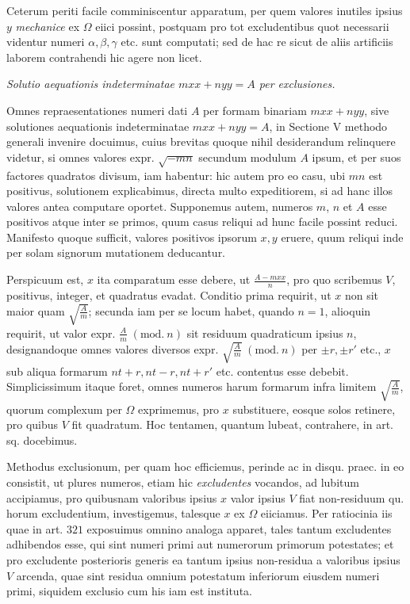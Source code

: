 Ceterum periti facile comminiscentur apparatum, per quem valores inutiles ipsius \(y\) \textit{mechanice} ex \(\Omega\) eiici possint, postquam pro tot excludentibus quot necessarii videntur numeri \(\alpha,\allowbreak \beta,\allowbreak \gamma\) etc. sunt computati; sed de hac re sicut de aliis artificiis laborem contrahendi hic agere non licet.

\begin{center}\textit{Solutio aequationis indeterminatae \(mxx+nyy=A\) per exclusiones.}\end{center}


Omnes repraesentationes numeri dati \(A\) per formam binariam \(mxx+nyy\),
sive solutiones aequationis indeterminatae \(mxx+nyy=A\), in Sectione V methodo generali invenire docuimus, cuius brevitas quoque nihil desiderandum relinquere videtur, si omnes valores expr. \(\surd{-mn}\) secundum modulum \(A\) ipsum, et per suos factores quadratos divisum, iam habentur: hic autem pro eo casu, ubi \(mn\) est positivus, solutionem explicabimus, directa multo expeditiorem, si ad hanc illos valores antea computare oportet. Supponemus autem, numeros \(m\), \(n\) et \(A\) esse positivos atque inter se primos, quum casus reliqui ad hunc facile possint reduci. Manifesto quoque sufficit, valores positivos ipsorum \(x,\allowbreak y\) eruere, quum reliqui inde per solam signorum mutationem deducantur.

Perspicuum est, \(x\) ita comparatum esse debere, ut \(\frac{A-mxx}{n}\), pro quo scribemus \(V\), positivus, integer, et quadratus evadat. Conditio prima requirit, ut \(x\) non sit maior quam \(\surd{\frac Am}\); secunda iam per se locum habet, quando \(n=1\), alioquin requirit, ut valor expr. \(\frac Am\; (\mathrm{mod}.\ n)\) sit residuum quadraticum ipsius \(n\), designandoque omnes valores diversos expr. \(\surd{\frac Am}\; (\mathrm{mod}.\ n)\) per \(\pm r,\allowbreak \pm r'\) etc., \(x\) sub aliqua formarum \(nt+r,\allowbreak nt-r,\allowbreak nt+r'\) etc. contentus esse debebit. Simplicissimum itaque foret, omnes numeros harum formarum infra limitem \(\surd{\frac Am}\), quorum complexum per \(\Omega\) exprimemus, pro \(x\) substituere, eosque solos retinere, pro quibus \(V\) fit quadratum. Hoc tentamen, quantum lubeat, contrahere, in art. sq. docebimus.

Methodus exclusionum, per quam hoc efficiemus, perinde ac in disqu. praec. in eo consistit, ut plures numeros, etiam hic \textit{excludentes} vocandos, ad lubitum accipiamus, pro quibusnam valoribus ipsius \(x\) valor ipsius \(V\) fiat non-residuum qu. horum excludentium, investigemus, talesque \(x\) ex \(\Omega\) eiiciamus. Per ratiocinia iis quae in art. \(321\) exposuimus omnino analoga apparet, tales tantum excludentes adhibendos esse, qui sint numeri primi aut numerorum primorum potestates; et pro excludente posterioris generis ea tantum ipsius non-residua a valoribus ipsius \(V\) arcenda, quae sint residua omnium potestatum inferiorum eiusdem numeri primi, siquidem exclusio cum his iam est instituta.

